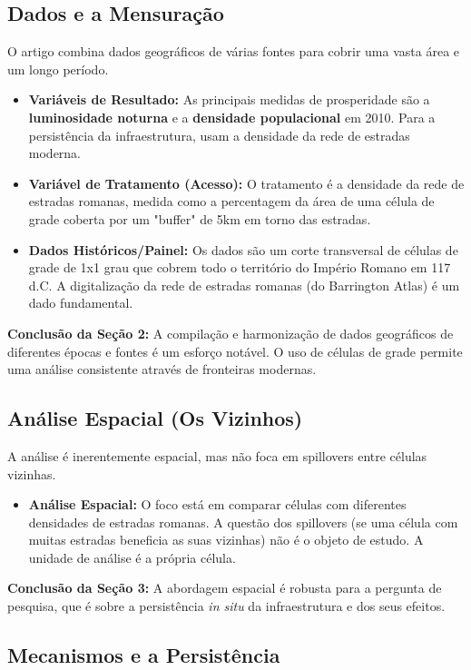 \documentclass[12pt, a4paper]{article}
\begin{document}
\subsection{Dados e a Mensuração}
O artigo combina dados geográficos de várias fontes para cobrir uma vasta área e um longo período.
\begin{itemize}
    \item \textbf{Variáveis de Resultado:} As principais medidas de prosperidade são a \textbf{luminosidade noturna} e a \textbf{densidade populacional} em 2010. Para a persistência da infraestrutura, usam a densidade da rede de estradas moderna.
    \item \textbf{Variável de Tratamento (Acesso):} O tratamento é a densidade da rede de estradas romanas, medida como a percentagem da área de uma célula de grade coberta por um "buffer" de 5km em torno das estradas.
    \item \textbf{Dados Históricos/Painel:} Os dados são um corte transversal de células de grade de 1x1 grau que cobrem todo o território do Império Romano em 117 d.C. A digitalização da rede de estradas romanas (do Barrington Atlas) é um dado fundamental.
\end{itemize}

\noindent\textbf{Conclusão da Seção 2:} A compilação e harmonização de dados geográficos de diferentes épocas e fontes é um esforço notável. O uso de células de grade permite uma análise consistente através de fronteiras modernas.

\subsection{Análise Espacial (Os Vizinhos)}
A análise é inerentemente espacial, mas não foca em spillovers entre células vizinhas.
\begin{itemize}
    \item \textbf{Análise Espacial:} O foco está em comparar células com diferentes densidades de estradas romanas. A questão dos spillovers (se uma célula com muitas estradas beneficia as suas vizinhas) não é o objeto de estudo. A unidade de análise é a própria célula.
\end{itemize}

\noindent\textbf{Conclusão da Seção 3:} A abordagem espacial é robusta para a pergunta de pesquisa, que é sobre a persistência \textit{in situ} da infraestrutura e dos seus efeitos.

\subsection{Mecanismos e a Persistência}
\end{document}
